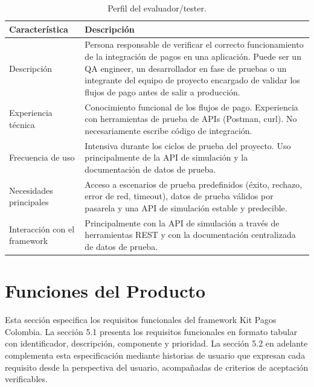 \documentclass[10pt]{article}
\begin{document}
\begin{table}[htbp]
  \centering
  \renewcommand{\arraystretch}{1.2}
  \begin{tabularx}{\textwidth}{|l|X|}
    \hline
    \textbf{Característica} & \textbf{Descripción} \\
    \hline
    Descripción & Persona responsable de verificar el correcto funcionamiento de la integración de pagos en una aplicación. Puede ser un QA engineer, un desarrollador en fase de pruebas o un integrante del equipo de proyecto encargado de validar los flujos de pago antes de salir a producción. \\
    \hline
    Experiencia técnica & Conocimiento funcional de los flujos de pago. Experiencia con herramientas de prueba de APIs (Postman, curl). No necesariamente escribe código de integración. \\
    \hline
    Frecuencia de uso & Intensiva durante los ciclos de prueba del proyecto. Uso principalmente de la API de simulación y la documentación de datos de prueba. \\
    \hline
    Necesidades principales & Acceso a escenarios de prueba predefinidos (éxito, rechazo, error de red, timeout), datos de prueba válidos por pasarela y una API de simulación estable y predecible. \\
    \hline
    Interacción con el framework & Principalmente con la API de simulación a través de herramientas REST y con la documentación centralizada de datos de prueba. \\
    \hline
  \end{tabularx}
  \caption{Perfil del evaluador/tester.}
  \label{tab:perfil-tester}
\end{table}



\section{Funciones del Producto}

Esta sección especifica los requisitos funcionales del framework Kit Pagos Colombia. La sección 5.1 presenta los requisitos funcionales en formato tabular con identificador, descripción, componente y prioridad. La sección 5.2 en adelante complementa esta especificación mediante historias de usuario que expresan cada requisito desde la perspectiva del usuario, acompañadas de criterios de aceptación verificables.
\end{document}
